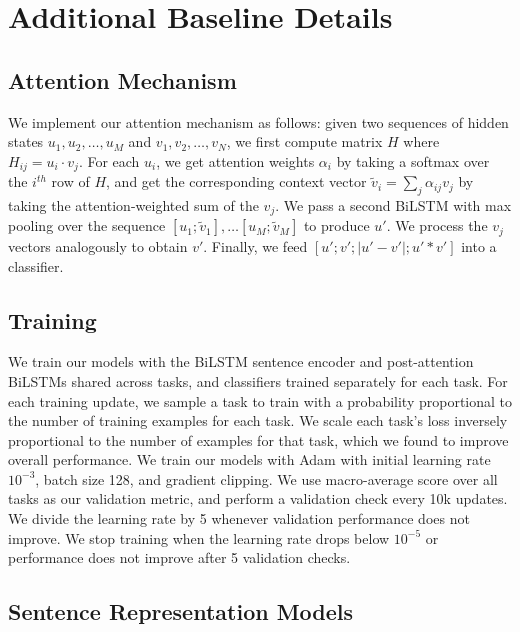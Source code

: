 \documentclass{article} \usepackage{iclr2019_conference,times}
\begin{document}
\section{Additional Baseline Details}\label{sec:apdx_baselines}

\subsection{Attention Mechanism}

We implement our attention mechanism as follows:
given two sequences of hidden states $u_1, u_2, \dots, u_M$ and $v_1, v_2, \dots, v_N$, we first compute matrix $H$ where $H_{ij} = u_i \cdot v_j$.
For each $u_i$, we get attention weights $\alpha_{i}$ by taking a softmax over the $i^{th}$ row of $H$, and get the corresponding context vector $\tilde{v}_i = \sum_j \alpha_{ij} v_j $ by taking the attention-weighted sum of the $v_j$. 
We pass a second BiLSTM with max pooling over the sequence $[u_1; \tilde{v}_1], \dots [u_M ; \tilde{v}_M]$ to produce $u'$.
We process the $v_j$ vectors analogously to obtain $v'$.
Finally, we feed $[u'; v'; |u' - v'|; u' * v']$ into a classifier.

\subsection{Training}

We train our models with the BiLSTM sentence encoder and post-attention BiLSTMs shared across tasks, and classifiers trained separately for each task.
For each training update, we sample a task to train with a probability proportional to the number of training examples for each task.
We scale each task's loss inversely proportional to the number of examples for that task, which we found to improve overall performance.
We train our models with Adam \citep{kingma2014adam} with initial learning rate $10^{-3}$, batch size 128, and gradient clipping.
We use macro-average score over all tasks as our validation metric, and perform a validation check every 10k updates.  
We divide the learning rate by 5 whenever validation performance does not improve. 
We stop training when the learning rate drops below $10^{-5}$ or performance does not improve after 5 validation checks. 

\subsection{Sentence Representation Models}
\end{document}

